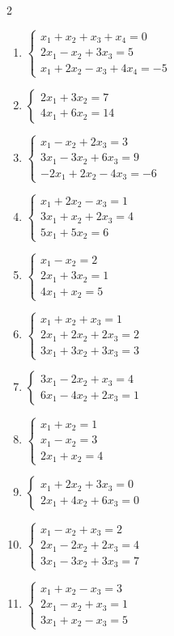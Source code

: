 \begin{multicols}{2}
\begin{enumerate}[label=\arabic*.,  leftmargin=*]
\item $\begin{cases}x_1+x_2+x_3+x_4=0\\2x_1-x_2+3x_3=5\\x_1+2x_2-x_3+4x_4=-5\end{cases}$
\item $\begin{cases}2x_1+3x_2=7\\4x_1+6x_2=14\end{cases}$
\item $\begin{cases}x_1-x_2+2x_3=3\\3x_1-3x_2+6x_3=9\\-2x_1+2x_2-4x_3=-6\end{cases}$
\item $\begin{cases}x_1+2x_2-x_3=1\\3x_1+x_2+2x_3=4\\5x_1+5x_2=6\end{cases}$
\item $\begin{cases}x_1-x_2=2\\2x_1+3x_2=1\\4x_1+x_2=5\end{cases}$
\item $\begin{cases}x_1+x_2+x_3=1\\2x_1+2x_2+2x_3=2\\3x_1+3x_2+3x_3=3\end{cases}$
\item $\begin{cases}3x_1-2x_2+x_3=4\\6x_1-4x_2+2x_3=1\end{cases}$
\item $\begin{cases}x_1+x_2=1\\x_1-x_2=3\\2x_1+x_2=4\end{cases}$
\item $\begin{cases}x_1+2x_2+3x_3=0\\2x_1+4x_2+6x_3=0\end{cases}$
\item $\begin{cases}x_1-x_2+x_3=2\\2x_1-2x_2+2x_3=4\\3x_1-3x_2+3x_3=7\end{cases}$
\item $\begin{cases}x_1+x_2-x_3=3\\2x_1-x_2+x_3=1\\3x_1+x_2-x_3=5\end{cases}$
\end{enumerate}
\end{multicols}
